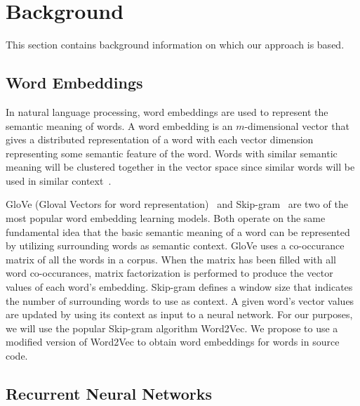 \section{Background}

This section contains background information on which our approach is based.

\subsection{Word Embeddings}

In natural language processing, word embeddings are used to represent the semantic meaning of words. A word embedding is an $m$-dimensional vector that gives a distributed representation of a word with each vector dimension representing some semantic feature of the word. Words with similar semantic meaning will be clustered together in the vector space since similar words will be used in similar context~\cite{mikolov2013distributed}.

GloVe (Gloval Vectors for word representation)~\cite{pennington2014glove} and Skip-gram~\cite{mikolov2013efficient} are two of the most popular word embedding learning models. Both operate on the same fundamental idea that the basic semantic meaning of a word can be represented by utilizing surrounding words as semantic context. GloVe uses a co-occurance matrix of all the words in a corpus. When the matrix has been filled with all word co-occurances, matrix factorization is performed to produce the vector values of each word's embedding. Skip-gram defines a window size that indicates the number of surrounding words to use as context. A given word's vector values are updated by using its context as input to a neural network. For our purposes, we will use the popular Skip-gram algorithm Word2Vec. We propose to use a modified version of Word2Vec to obtain word embeddings for words in source code. 


 
\subsection{Recurrent Neural Networks}

